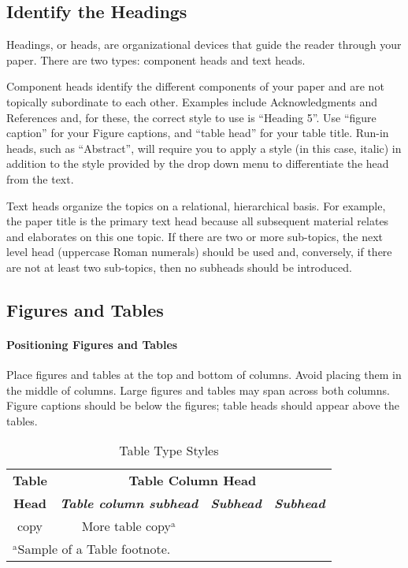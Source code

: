 \documentclass[conference]{IEEEtran}
\begin{document}
\subsection{Identify the Headings}
Headings, or heads, are organizational devices that guide the reader through 
your paper. There are two types: component heads and text heads.

Component heads identify the different components of your paper and are not 
topically subordinate to each other. Examples include Acknowledgments and 
References and, for these, the correct style to use is ``Heading 5''. Use 
``figure caption'' for your Figure captions, and ``table head'' for your 
table title. Run-in heads, such as ``Abstract'', will require you to apply a 
style (in this case, italic) in addition to the style provided by the drop 
down menu to differentiate the head from the text.

Text heads organize the topics on a relational, hierarchical basis. For 
example, the paper title is the primary text head because all subsequent 
material relates and elaborates on this one topic. If there are two or more 
sub-topics, the next level head (uppercase Roman numerals) should be used 
and, conversely, if there are not at least two sub-topics, then no subheads 
should be introduced.

\subsection{Figures and Tables}
\paragraph{Positioning Figures and Tables} Place figures and tables at the top and 
bottom of columns. Avoid placing them in the middle of columns. Large 
figures and tables may span across both columns. Figure captions should be 
below the figures; table heads should appear above the tables.

\begin{table}[htbp]
\caption{Table Type Styles}
\begin{center}
\begin{tabular}{|c|c|c|c|}
\hline
\textbf{Table}&\multicolumn{3}{|c|}{\textbf{Table Column Head}} \\
\cline{2-4} 
\textbf{Head} & \textbf{\textit{Table column subhead}}& \textbf{\textit{Subhead}}& \textbf{\textit{Subhead}} \\
\hline
copy& More table copy$^{\mathrm{a}}$& &  \\
\hline
\multicolumn{4}{l}{$^{\mathrm{a}}$Sample of a Table footnote.}
\end{tabular}
\label{tab1}
\end{center}
\end{table}
\end{document}
